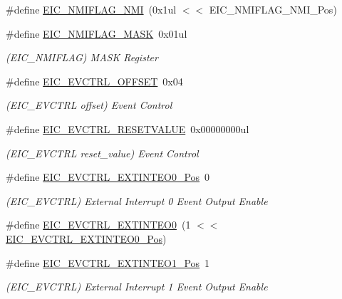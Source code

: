 \begin{DoxyCompactItemize}
\#define \mbox{\hyperlink{group___s_a_m_d21___e_i_c_gadeb5d88236a7732ba0c74a95460abf51}{E\+I\+C\+\_\+\+N\+M\+I\+F\+L\+A\+G\+\_\+\+N\+MI}}~(0x1ul $<$$<$ E\+I\+C\+\_\+\+N\+M\+I\+F\+L\+A\+G\+\_\+\+N\+M\+I\+\_\+\+Pos)
\item 
\#define \mbox{\hyperlink{group___s_a_m_d21___e_i_c_ga540d29cea93e30799215ac9a446bb8f9}{E\+I\+C\+\_\+\+N\+M\+I\+F\+L\+A\+G\+\_\+\+M\+A\+SK}}~0x01ul
\begin{DoxyCompactList}\small\item\em (E\+I\+C\+\_\+\+N\+M\+I\+F\+L\+AG) M\+A\+SK Register \end{DoxyCompactList}\item 
\#define \mbox{\hyperlink{group___s_a_m_d21___e_i_c_ga1e9f53fbff309ef9b2ecfa6276b72f15}{E\+I\+C\+\_\+\+E\+V\+C\+T\+R\+L\+\_\+\+O\+F\+F\+S\+ET}}~0x04
\begin{DoxyCompactList}\small\item\em (E\+I\+C\+\_\+\+E\+V\+C\+T\+RL offset) Event Control \end{DoxyCompactList}\item 
\#define \mbox{\hyperlink{group___s_a_m_d21___e_i_c_gaa55f28b19d883994bcd6ade4425eea0a}{E\+I\+C\+\_\+\+E\+V\+C\+T\+R\+L\+\_\+\+R\+E\+S\+E\+T\+V\+A\+L\+UE}}~0x00000000ul
\begin{DoxyCompactList}\small\item\em (E\+I\+C\+\_\+\+E\+V\+C\+T\+RL reset\+\_\+value) Event Control \end{DoxyCompactList}\item 
\#define \mbox{\hyperlink{group___s_a_m_d21___e_i_c_ga8d4fd992a63059b410149af497b2b7bc}{E\+I\+C\+\_\+\+E\+V\+C\+T\+R\+L\+\_\+\+E\+X\+T\+I\+N\+T\+E\+O0\+\_\+\+Pos}}~0
\begin{DoxyCompactList}\small\item\em (E\+I\+C\+\_\+\+E\+V\+C\+T\+RL) External Interrupt 0 Event Output Enable \end{DoxyCompactList}\item 
\#define \mbox{\hyperlink{group___s_a_m_d21___e_i_c_ga3d56c5e3944578f4a2c9502aef7242c4}{E\+I\+C\+\_\+\+E\+V\+C\+T\+R\+L\+\_\+\+E\+X\+T\+I\+N\+T\+E\+O0}}~(1 $<$$<$ \mbox{\hyperlink{group___s_a_m_d21___e_i_c_ga8d4fd992a63059b410149af497b2b7bc}{E\+I\+C\+\_\+\+E\+V\+C\+T\+R\+L\+\_\+\+E\+X\+T\+I\+N\+T\+E\+O0\+\_\+\+Pos}})
\item 
\#define \mbox{\hyperlink{group___s_a_m_d21___e_i_c_ga52b37e5d5286cd75a1f4f750c2aaaa36}{E\+I\+C\+\_\+\+E\+V\+C\+T\+R\+L\+\_\+\+E\+X\+T\+I\+N\+T\+E\+O1\+\_\+\+Pos}}~1
\begin{DoxyCompactList}\small\item\em (E\+I\+C\+\_\+\+E\+V\+C\+T\+RL) External Interrupt 1 Event Output Enable \end{DoxyCompactList}\item 

\end{DoxyCompactItemize}
